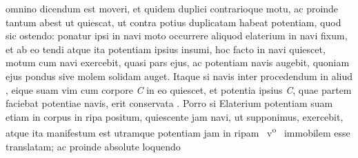 omnino dicendum est moveri, et quidem duplici contrarioque motu,%
\protect{}
ac proinde tantum abest ut quiescat, ut contra potius duplicatam
habeat potentiam,%
\protect{} quod sic ostendo: ponatur ipsi in navi%
\protect{} moto occurrere
aliquod elaterium in navi fixum,%
\protect{} et
%
%
ab eo tendi
atque ita potentiam%
\protect{} ipsius insumi, hoc facto in navi%
\protect{} quiescet, 
%
%
motum cum navi exercebit, quasi pars ejus, ac potentiam%
\protect{}
%
navis\protect{} augebit, quoniam ejus pondus%
\protect{} sive molem solidam%
\protect{} auget. Itaque
si %
navis\protect{} inter procedendum in aliud 
%
%
,
%
eique suam vim%
\protect{}
%
%
cum corpore \textit{C} in eo quiescet, 
et %
potentia\protect{} ipsius \textit{C}, quae partem faciebat %
potentiae\protect{} navis, erit conservata
%
. 
%
Porro si Elaterium%
\protect{}
%
%
potentiam%
\protect{} suam
etiam in corpus in ripa%
\protect{} positum, quiescente jam navi, ut supponimus, exercebit,
atque ita manifestum est utramque potentiam%
\protect{} jam in ripam%
\protect{}
~v\textsuperscript{o}\rbrack\
immobilem esse translatam; ac proinde absolute loquendo
